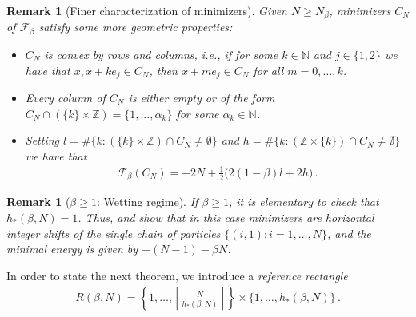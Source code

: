 \documentclass[reqno]{amsart}
\theoremstyle{plain}
\newtheorem{remark}[theorem]{Remark}
\theoremstyle{definition}
\numberwithin{equation}{section}
\begin{document}
\begin{remark}[Finer characterization of minimizers]\label{rem:convexity etc.} \rm
Given $N \geq N_\beta$, minimizers  $C_N$  of $\mathcal{F}_\beta$ satisfy some more geometric properties:
\begin{itemize}
\item[{\rm(i)}] $C_N$ is {\it convex by rows and columns}, i.e., if for some $k \in \mathbb{N}$ and $j \in \{1,2\}$ we have that  $x, x+ke_j \in C_N$,  then $x+m e_j \in C_N$ for all $m=0,\ldots,k$.
\item[{\rm (ii)}] Every {\it column} of $C_N$ is either empty or of the form $C_N \cap (\{k\} \times \mathbb{Z}) = \{1,\ldots,\alpha_k\}$ for some $\alpha_k \in \mathbb{N}$.
\item[{\rm (iii)}] Setting $l= \#\{k\colon (\{k\} \times \mathbb{Z})
  \cap C_N   \neq \emptyset\}$ and $h =\#\{k\colon (\mathbb{Z}\times
  \{k\})  \cap C_N   \neq \emptyset\}$ we have that 
\begin{align*}
\mathcal{F}_\beta(C_N) =  - 2N + \frac{1}{2} \big(  2(1-\beta)  l +2h
  \big)\,.   
\end{align*}
\end{itemize}
\end{remark}

 

\begin{remark}[$\beta \geq 1$: Wetting regime]\label{rem:wetting} \rm
If $\beta \ge 1$, it is elementary to check that $ h_*(\beta,N) =
1$. Thus,   and   show that in this case  minimizers are  horizontal   integer shifts of the single chain of  particles   $\lbrace (i,1) \colon i = 1,\ldots,N \rbrace$, and the minimal energy is given by  $ -(N-1)  - \beta N$.
\end{remark}




 
In order to state the next theorem, we introduce a \emph{reference rectangle}
\begin{align*}
R(\beta,N) =  \left\{1,\ldots,\left\lceil \frac{N}{h_*(\beta,N)}\right\rceil\right\} \times \{1,\ldots, h_*(\beta,N)\} \,.
\end{align*}
\end{document}

